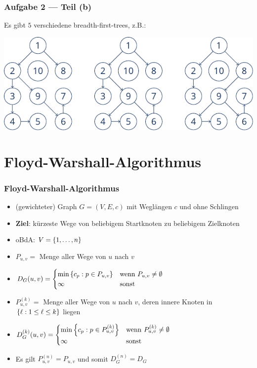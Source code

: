 \documentclass{beamer}
\begin{document}
\begin{frame} \frametitle{Aufgabe 2 --- Teil (b)}
	Es gibt $5$ verschiedene breadth-first-trees, z.B.:
	
	\includegraphics[width=\linewidth]{./tut11_task2-bft.pdf}
\end{frame}


\section{Floyd-Warshall-Algorithmus}

\begin{frame} \frametitle{Floyd-Warshall-Algorithmus}
	\begin{itemize}
		\item (gewichteter) Graph $G = (V,E,c)$ mit Weglängen $c$ und ohne Schlingen
		\item \textbf{Ziel}: kürzeste Wege von beliebigem Startknoten zu beliebigem Zielknoten
		\item oBdA: $V = \left\{ 1, \dots, n \right\}$
		\item $P_{u,v} =$ Menge aller Wege von $u$ nach $v$
		\item $D_G (u,v) = \begin{cases}
		\min\left\{ c_p : p \in P_{u,v} \right\} & \text{wenn } P_{u,v} \neq \emptyset \\
		\infty & \text{sonst}
		\end{cases}$
		\item $P^{(k)}_{u,v} =$ Menge aller Wege von $u$ nach $v$, deren innere Knoten in $\left\{ \ell : 1 \le \ell \le k \right\}$ liegen
		\item $D_G^{(k)} (u,v) = \begin{cases}
		\min\left\{ c_p : p \in P_{u,v}^{(k)} \right\} & \text{wenn } P_{u,v}^{(k)} \neq \emptyset \\
		\infty & \text{sonst}
		\end{cases}$
		\item Es gilt $P^{(n)}_{u,v} = P_{u,v}$ und somit $D_G^{(n)} = D_G$
	\end{itemize}
\end{frame}
\end{document}
